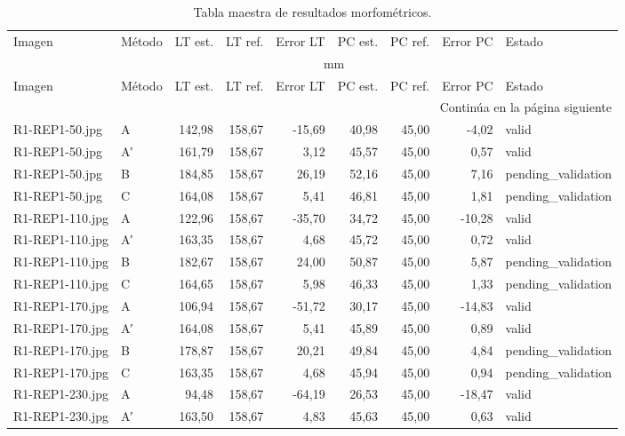 \begin{scriptsize}
\setlength{\LTleft}{0pt}
\setlength{\LTright}{0pt}
\begin{longtable}{@{}llrrrrrrl@{}}
\caption{Tabla maestra de resultados morfométricos.}\label{tab:maestra-completa}\\
\toprule
Imagen & Método & LT est. & LT ref. & Error LT & PC est. & PC ref. & Error PC & Estado \\
 & & \multicolumn{6}{c}{mm} & \\
\midrule
\endfirsthead
\toprule
Imagen & Método & LT est. & LT ref. & Error LT & PC est. & PC ref. & Error PC & Estado \\
\midrule
\endhead
\midrule
\multicolumn{9}{r}{Continúa en la página siguiente}\\
\endfoot
\bottomrule
\endlastfoot
R1-REP1-50.jpg & A & 142,98 & 158,67 & -15,69 & 40,98 & 45,00 & -4,02 & valid \\
R1-REP1-50.jpg & A′ & 161,79 & 158,67 & 3,12 & 45,57 & 45,00 & 0,57 & valid \\
R1-REP1-50.jpg & B & 184,85 & 158,67 & 26,19 & 52,16 & 45,00 & 7,16 & pending\_validation \\
R1-REP1-50.jpg & C & 164,08 & 158,67 & 5,41 & 46,81 & 45,00 & 1,81 & pending\_validation \\
R1-REP1-110.jpg & A & 122,96 & 158,67 & -35,70 & 34,72 & 45,00 & -10,28 & valid \\
R1-REP1-110.jpg & A′ & 163,35 & 158,67 & 4,68 & 45,72 & 45,00 & 0,72 & valid \\
R1-REP1-110.jpg & B & 182,67 & 158,67 & 24,00 & 50,87 & 45,00 & 5,87 & pending\_validation \\
R1-REP1-110.jpg & C & 164,65 & 158,67 & 5,98 & 46,33 & 45,00 & 1,33 & pending\_validation \\
R1-REP1-170.jpg & A & 106,94 & 158,67 & -51,72 & 30,17 & 45,00 & -14,83 & valid \\
R1-REP1-170.jpg & A′ & 164,08 & 158,67 & 5,41 & 45,89 & 45,00 & 0,89 & valid \\
R1-REP1-170.jpg & B & 178,87 & 158,67 & 20,21 & 49,84 & 45,00 & 4,84 & pending\_validation \\
R1-REP1-170.jpg & C & 163,35 & 158,67 & 4,68 & 45,94 & 45,00 & 0,94 & pending\_validation \\
R1-REP1-230.jpg & A & 94,48 & 158,67 & -64,19 & 26,53 & 45,00 & -18,47 & valid \\
R1-REP1-230.jpg & A′ & 163,50 & 158,67 & 4,83 & 45,63 & 45,00 & 0,63 & valid \\

\end{longtable}
\end{scriptsize}
